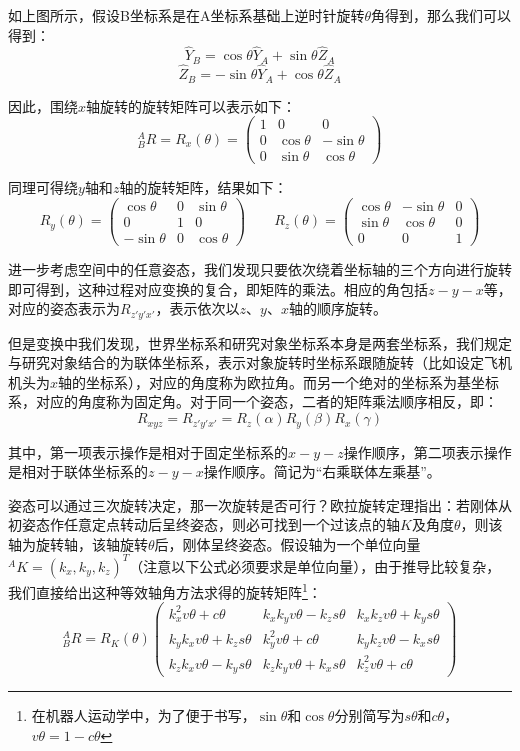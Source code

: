 如上图所示，假设B坐标系是在A坐标系基础上逆时针旋转$\theta$角得到，那么我们可以得到：
\[\hat{Y}_B = \cos\theta \hat{Y}_A + \sin\theta \hat{Z}_A\]
\[\hat{Z}_B = -\sin\theta \hat{Y}_A + \cos\theta \hat{Z}_A\]

因此，围绕$x$轴旋转的旋转矩阵可以表示如下：
\[{}^A_B R = R_x(\theta) = 
\begin{pmatrix}
    1 & 0 & 0 \\
    0 & \cos\theta & -\sin\theta \\
    0 & \sin\theta & \cos\theta
\end{pmatrix}
\]

同理可得绕$y$轴和$z$轴的旋转矩阵，结果如下：
\[R_y(\theta) = 
\begin{pmatrix}
    \cos\theta & 0 & \sin\theta \\
    0 & 1 & 0 \\
    -\sin\theta & 0 & \cos\theta
\end{pmatrix}
\qquad
R_z(\theta) = 
\begin{pmatrix}
    \cos\theta & -\sin\theta & 0 \\
    \sin\theta & \cos\theta & 0 \\
    0 & 0 & 1
\end{pmatrix}
\]

进一步考虑空间中的任意姿态，我们发现只要依次绕着坐标轴的三个方向进行旋转即可得到，这种过程对应变换的复合，即矩阵的乘法。相应的角包括$z-y-x$等，对应的姿态表示为$R_{z'y'x'}$，表示依次以$z$、$y$、$x$轴的顺序旋转。

但是变换中我们发现，世界坐标系和研究对象坐标系本身是两套坐标系，我们规定与研究对象结合的为联体坐标系，表示对象旋转时坐标系跟随旋转（比如设定飞机机头为$x$轴的坐标系），对应的角度称为欧拉角。而另一个绝对的坐标系为基坐标系，对应的角度称为固定角。对于同一个姿态，二者的矩阵乘法顺序相反，即：
\[R_{xyz} = R_{z'y'x'} = R_z(\alpha) R_y(\beta) R_x(\gamma)\]

其中，第一项表示操作是相对于固定坐标系的$x-y-z$操作顺序，第二项表示操作是相对于联体坐标系的$z-y-x$操作顺序。简记为“右乘联体左乘基”。

姿态可以通过三次旋转决定，那一次旋转是否可行？欧拉旋转定理指出：若刚体从初姿态作任意定点转动后呈终姿态，则必可找到一个过该点的轴$K$及角度$\theta$，则该轴为旋转轴，该轴旋转$\theta$后，刚体呈终姿态。假设轴为一个单位向量${}^A K = (k_x,k_y,k_z)^T$（注意以下公式必须要求是单位向量），由于推导比较复杂，我们直接给出这种等效轴角方法求得的旋转矩阵\footnote{在机器人运动学中，为了便于书写，$\sin \theta$和$\cos \theta$分别简写为$s\theta$和$c\theta$，$v\theta = 1-c\theta$}：
\[{}^A_B R = R_K(\theta)
\begin{pmatrix}
    k_x^2 v\theta+c\theta & k_x k_y v\theta-k_z s\theta & k_x k_z v\theta+k_y s\theta \\
    k_y k_x v\theta+k_z s\theta & k_y^2 v\theta+c\theta & k_y k_z v\theta-k_x s\theta \\
    k_z k_x v\theta-k_y s\theta & k_z k_y v\theta+k_x s\theta & k_z^2 v\theta+c\theta
\end{pmatrix}
\]
